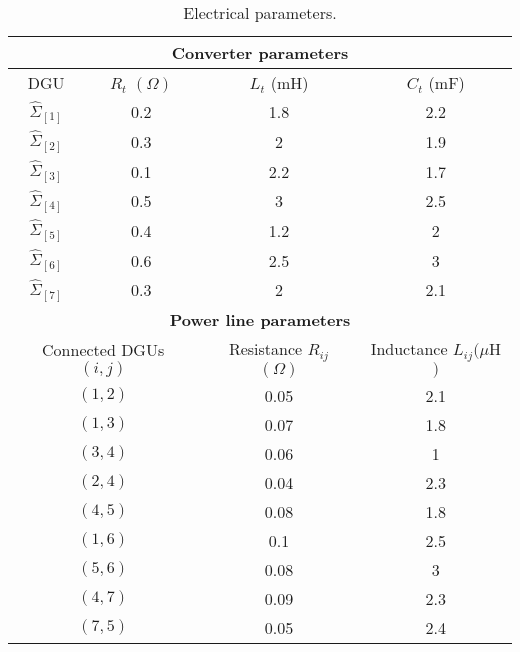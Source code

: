 \documentclass[a4paper]{article}
\theoremstyle{plain}
\newcommand{\subss}[2]{{#1}_{[#2]}}
\begin{document}
 \begin{table}[h]
 	\centering
 	\begin{tabular}{*{4}{c}}
 		\toprule
 		\multicolumn{4}{c}{\textbf{Converter parameters}} \\
 		\midrule
 		DGU & $R_t$ $(\Omega)$ & $L_{t}$ (mH) & $C_t$ (mF)\\
 		\midrule
 		$\subss{\hat{\Sigma}}{1}$ & 0.2  & 1.8 & 2.2 \\
 		$\subss{\hat{\Sigma}}{2}$& 0.3 & 2 & 1.9 \\
 		$\subss{\hat{\Sigma}}{3}$& 0.1 & 2.2 & 1.7 \\
 		$\subss{\hat{\Sigma}}{4}$& 0.5 & 3 & 2.5 \\
 		$\subss{\hat{\Sigma}}{5}$& 0.4 & 1.2 & 2 \\
 		$\subss{\hat{\Sigma}}{6}$& 0.6 & 2.5 & 3 \\
 		$\subss{\hat{\Sigma}}{7}$& 0.3 & 2 & 2.1 \\
 		\midrule
 		\multicolumn{4}{c}{\textbf{Power line parameters}}\\
 		\toprule
 		\multicolumn{2}{c}{Connected DGUs $(i,j)$} & Resistance $R_{ij}$ $(\Omega)$ & Inductance
 		$L_{ij} (\mu$H$)$ \\
 		\midrule
 		\multicolumn{2}{c}{$(1,2)$} & 0.05 & 2.1 \\
 		\multicolumn{2}{c}{$(1,3)$} & 0.07 & 1.8 \\
 		\multicolumn{2}{c}{$(3,4)$} & 0.06 & 1 \\
 		\multicolumn{2}{c}{$(2,4)$} & 0.04 & 2.3 \\
 		\multicolumn{2}{c}{$(4,5)$} & 0.08 & 1.8 \\
 		\multicolumn{2}{c}{$(1,6)$} & 0.1 & 2.5 \\
 		\multicolumn{2}{c}{$(5,6)$} & 0.08 & 3 \\
 		\multicolumn{2}{c}{$(4,7)$} & 0.09 & 2.3 \\
 		\multicolumn{2}{c}{$(7,5)$} & 0.05 & 2.4 \\
 		\bottomrule
 	\end{tabular}
 	\caption{Electrical parameters.}	
 	\label{tbl:Ch5_el_parameters}
 \end{table}
 


 
 
    
     \clearpage


   
     
\end{document}
